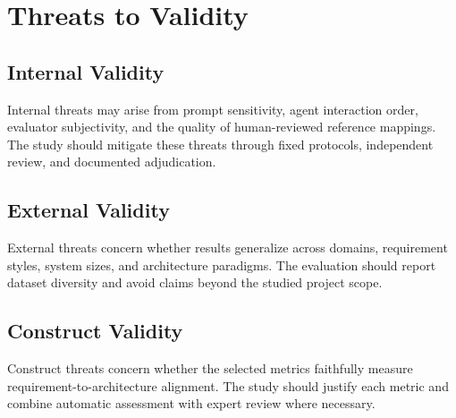 \section{Threats to Validity}
\label{threats}

\subsection{Internal Validity}
\label{sec:threats-internal}

Internal threats may arise from prompt sensitivity, agent interaction order, evaluator subjectivity, and the quality of human-reviewed reference mappings.
The study should mitigate these threats through fixed protocols, independent review, and documented adjudication.

\subsection{External Validity}
\label{sec:threats-external}

External threats concern whether results generalize across domains, requirement styles, system sizes, and architecture paradigms.
The evaluation should report dataset diversity and avoid claims beyond the studied project scope.

\subsection{Construct Validity}
\label{sec:threats-construct}

Construct threats concern whether the selected metrics faithfully measure requirement-to-architecture alignment.
The study should justify each metric and combine automatic assessment with expert review where necessary.

